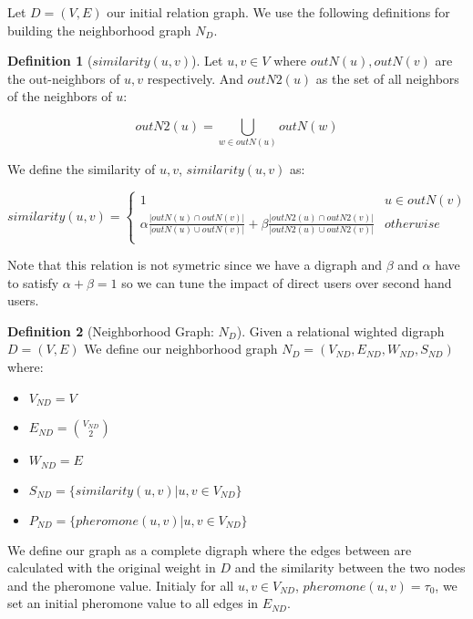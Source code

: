 \documentclass[letter,10pt]{article}
\theoremstyle{definition}
\newtheorem{definition}{Definition}[section]
\begin{document}
Let $D = (V,E)$ our initial relation graph. We use the following definitions for building the neighborhood graph $N_D$.

\begin{definition}[$similarity(u,v)$] Let $u,v\in V$ where $outN(u), outN(v)$ are the out-neighbors of $u,v$ respectively.  And $outN2(u)$ as the set of all neighbors of the neighbors of $u$:

\[
outN2(u) =
\bigcup_{w\in outN(u)} outN(w)
\]

We define the similarity of $u,v$, $similarity(u,v)$ as:

\[
similarity(u,v) = 
     \begin{cases}
       1 & u\in outN(v)\\
       \alpha \frac{|outN(u) \cap outN(v)|}{|outN(u) \cup outN(v)|}+
       \beta \frac{|outN2(u) \cap outN2(v)|}{|outN2(u) \cup outN2(v)|}
       & otherwise\\
       
     \end{cases}
\]
\end{definition}

Note that this relation is not symetric since we have a digraph and $\beta$ and $\alpha$ have to satisfy $\alpha +\beta = 1$ so we can tune the impact of direct users over second hand users. 

\begin{definition}[Neighborhood Graph: $N_D$] Given a relational wighted digraph $D=(V,E)$ We define our neighborhood graph $N_D=(V_{ND}, E_{ND}, W_{ND}, S_{ND})$ where:
\begin{itemize}
    \item $V_{ND} = V$
    \item $E_{ND} = \binom {V_{ND}}2$
    \item $W_{ND} = E$
    \item $S_{ND} = \{ similarity(u,v) | u,v\in V_{ND}\}$
    \item $P_{ND} = \{ pheromone(u,v) | u,v\in V_{ND}\}$
\end{itemize}

\end{definition}

We define our graph as a complete digraph where the edges between are calculated with the original weight in $D$ and the similarity between the two nodes and the pheromone value. Initialy for all $u,v\in V_{ND}$, $pheromone(u,v) = \tau_0$, we set an initial pheromone value to all edges in $E_{ND}$.
\end{document}
